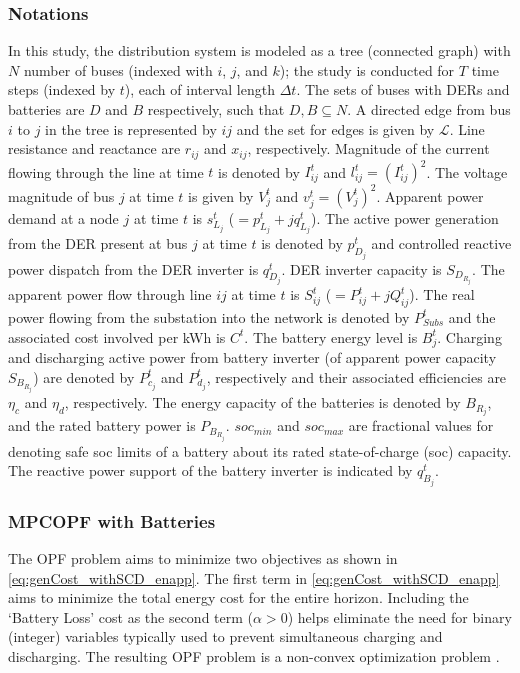 \subsubsection{Notations}
In this study, the distribution system is modeled as a tree (connected graph) with $N$ number of buses (indexed with \(i\), \(j\), and \(k\)); the study is conducted for $T$ time steps (indexed by $t$), each of interval length $\Delta t$. The sets of buses with DERs and batteries are $D$ and $B$ respectively, such that $D, B \subseteq N$.
A directed edge from bus $i$ to $j$ in the tree is represented by $ij$ and the set for edges is given by $\mathcal{L}$. Line resistance and reactance are \(r_{ij}\) and \(x_{ij}\), respectively. Magnitude of the current flowing through the line at time \(t\) is denoted by \(I_{ij}^t\) and  $l_{ij}^t=\left(I_{ij}^t\right)^2$. The voltage magnitude of bus \(j\) at time \(t\) is given by \(V_j^t\) and  $v_j^t=\left(V_j^t\right)^2$. Apparent power demand at a node \(j\) at time \(t\) is \(s^t_{L_j}\) (\(=p^t_{L_j}+\textit{j}q^t_{L_j}\)). The active power generation from the DER present at bus \(j\) at time \(t\) is denoted by \(p^t_{D_j}\) and controlled reactive power dispatch from the DER inverter is \(q^t_{D_j}\). DER inverter capacity is $S_{D_{R_j}}$.
The apparent power flow through line {\(ij\)} at time \(t\) is \(S_{ij}^t\) (\(=P_{ij}^t+\textit{j}Q_{ij}^t\)). The real power flowing from the substation into the network is denoted by $P^t_{Subs}$ and the associated cost involved per kWh is $C^t$. The battery energy level is \(B_j^t\). Charging and discharging active power from battery inverter (of apparent power capacity $S_{B_{R_j}}$) are denoted by \(P_{c_j}^t\) and \(P_{d_j}^t\), respectively and their associated efficiencies are $\eta_c$ and $\eta_d$, respectively. The energy capacity of the batteries is denoted by $B_{R_j}$, and the rated battery power is $P_{B_{R_j}}$. $soc_{min}$ and $soc_{max}$ are fractional values for denoting safe soc limits of a battery about its rated state-of-charge (soc) capacity. The reactive power support of the battery inverter is indicated by \(q_{B_j}^t\). 

\subsubsection{MPCOPF with Batteries}
The OPF problem aims to minimize two objectives as shown in \cref{eq:genCost_withSCD_enapp}. The first term in \cref{eq:genCost_withSCD_enapp} aims to minimize the total energy cost for the entire horizon. Including the `Battery Loss' cost as the second term ($\alpha > 0$) helps eliminate the need for binary (integer) variables typically used to prevent simultaneous charging and discharging. The resulting OPF problem is a non-convex optimization problem \cite{Nazir2021Sep}.

